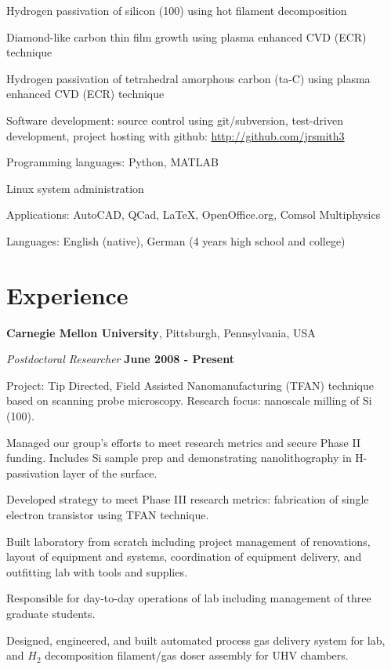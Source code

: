\documentclass[letterpaper,margin,line]{res}
\newenvironment{list1}{
  \begin{list}{\ding{113}}{%
      \setlength{\itemsep}{0in}
      \setlength{\parsep}{0in} \setlength{\parskip}{0in}
      \setlength{\topsep}{0in} \setlength{\partopsep}{0in} 
      \setlength{\leftmargin}{0.17in}}}{\end{list}}
\begin{document}
\begin{resume}
\vspace*{-2.5mm}
Hydrogen passivation of silicon (100) using hot filament decomposition

\vspace*{-2.5mm}
Diamond-like carbon thin film growth using plasma enhanced CVD (ECR) technique

\vspace*{-2.5mm}
Hydrogen passivation of tetrahedral amorphous carbon (ta-C) using plasma enhanced CVD (ECR) technique

\vspace*{-2.5mm}
Software development: source control using git/subversion, test-driven development, project hosting with github: \href{http://github.com/jrsmith3}{http://github.com/jrsmith3}

\vspace*{-2.5mm}
Programming languages: Python, MATLAB

\vspace*{-2.5mm}
Linux system administration

\vspace*{-2.5mm}
Applications: AutoCAD, QCad, \LaTeX, OpenOffice.org, Comsol Multiphysics

\vspace*{-2.5mm}
Languages: English (native), German (4 years high school and college)

\section{\sc Experience}
{\bf Carnegie Mellon University}, Pittsburgh, Pennsylvania, USA

\vspace{-.3cm}
{\em Postdoctoral Researcher} \hfill {\bf June 2008 - Present}\\
\begin{list1}
\item[] Project: Tip Directed, Field Assisted Nanomanufacturing (TFAN) technique based on scanning probe microscopy. Research focus: nanoscale milling of Si (100).
\item[] Managed our group's efforts to meet research metrics and secure Phase II funding. Includes Si sample prep and demonstrating nanolithography in H-passivation layer of the surface.
\item[] Developed strategy to meet Phase III research metrics: fabrication of single electron transistor using TFAN technique.
\item[] Built laboratory from scratch including project management of renovations, layout of equipment and systems, coordination of equipment delivery, and outfitting lab with tools and supplies.
\item[] Responsible for day-to-day operations of lab including management of three graduate students.
\item[] Designed, engineered, and built automated process gas delivery system for lab, and $H_{2}$ decomposition filament/gas doser assembly for UHV chambers.
\end{list1}



\end{resume}
\end{document}
